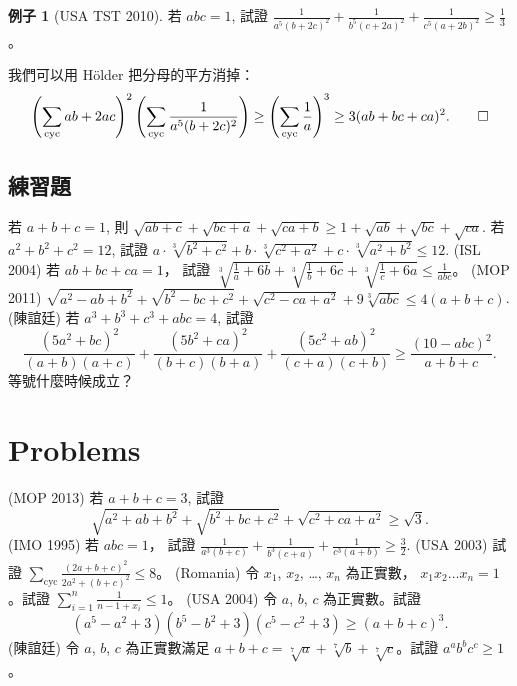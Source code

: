 \documentclass[11pt,nothm]{scrartcl}
\theoremstyle{definition}
\newtheorem{example}[theorem]{\color{blue!40!black}例子}
\let\oldendproof\endproof
\renewenvironment{proof}[1][【證】]{%
  \oldproof[\bfseries #1\nopunct]%
}{\oldendproof}
\begin{document}
\begin{example}
  [USA TST 2010] 若 $abc=1$, 試證 $ \frac{1}{a^5(b+2c)^2}+\frac{1}{b^5(c+2a)^2}+\frac{1}{c^5(a+2b)^2}\ge\frac{1}{3} $。
\end{example}
\begin{proof}
  我們可以用 H\"older 把分母的平方消掉：
  \[ \left(\sum_{\text{cyc}}ab+2 ac\right)^2\left(\sum_{\text{cyc}}\frac{1}{a^5(b+2c)^2}\right)\ge\left(\sum_{\text{cyc}}\frac{1}{a}\right)^3\ge 3(ab+bc+ca)^2. \qedhere \]
\end{proof}



\subsection{練習題}
\begin{enumerate}
  \ii 若 $a+b+c=1$, 則 $\sqrt{ab+c}+\sqrt{bc+a}+\sqrt{ca+b} \ge 1+\sqrt{ab}+\sqrt{bc}+\sqrt{ca}$.
  \ii 若 $a^2+b^2+c^2=12$, 試證 $a\cdot\sqrt[3]{b^2+c^2}+b\cdot\sqrt[3]{c^2+a^2}+c\cdot\sqrt[3]{a^2+b^2}\leq 12$.
  \ii (ISL 2004) 若 $ab+bc+ca=1$， 試證 $ \sqrt[3]{\frac{1}{a}+6b}+\sqrt[3]{\frac{1}{b}+6c}+\sqrt[3]{\frac{1}{c}+6a }\leq\frac{1}{abc}$。
  \ii (MOP 2011) $\sqrt{a^2-ab+b^2}+\sqrt{b^2-bc+c^2} + \sqrt{c^2-ca+a^2} + 9\sqrt[3]{abc} \le 4(a+b+c)$.
  \ii (陳誼廷) 若 $a^3+b^3+c^3+abc=4$, 試證
  \[ \frac{(5a^2+bc)^2}{(a+b)(a+c)}+\frac{(5b^2+ca)^2}{(b+c)(b+a)}+\frac{(5c^2+ab)^2}{(c+a)(c+b)}\ge\frac{(10-abc)^2}{a+b+c}. \]
  等號什麼時候成立？
\end{enumerate}

\section{Problems}
\begin{enumerate}
  \ii (MOP 2013) 若 $a+b+c=3$, 試證 \[ \sqrt{a^2+ab+b^2}+\sqrt{b^2+bc+c^2}+\sqrt{c^2+ca+a^2} \ge \sqrt 3. \]
  \ii (IMO 1995) 若 $abc=1$， 試證 $\frac{1}{a^3(b+c)}+\frac{1}{b^3(c+a)}+\frac{1}{c^3(a+b)}\ge\frac{3}{2}$.
  \ii (USA 2003) 試證 $\sum_{\text{cyc}} \frac{(2a+b+c)^2}{2a^2+(b+c)^2} \le 8$。
  \ii (Romania) 令 $x_1$, $x_2$, \dots, $x_n$ 為正實數， $x_1x_2 \dots x_n=1$。試證 $\sum_{i=1}^n \frac{1}{n-1+x_i} \le 1$。
  \ii (USA 2004) 令 $a$, $b$, $c$ 為正實數。試證
  \[ \left( a^5-a^2+3 \right)\left( b^5-b^2+3 \right)\left( c^5-c^2+3 \right) \ge \left( a+b+c \right)^3. \]
  \ii (陳誼廷) 令 $a$, $b$, $c$ 為正實數滿足 $a+b+c = \sqrt[7]{a} + \sqrt[7]{b} + \sqrt[7]{c}$。試證 $a^a b^b c^c \ge 1$。
\end{enumerate}
\end{document}
